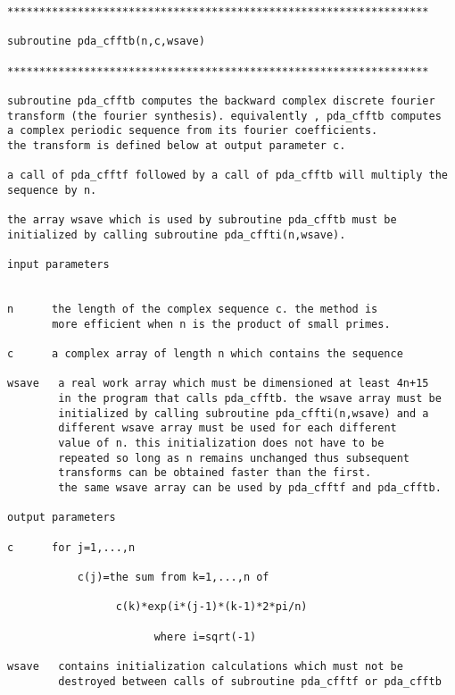 \begin{verbatim}
******************************************************************

subroutine pda_cfftb(n,c,wsave)

******************************************************************

subroutine pda_cfftb computes the backward complex discrete fourier
transform (the fourier synthesis). equivalently , pda_cfftb computes
a complex periodic sequence from its fourier coefficients.
the transform is defined below at output parameter c.

a call of pda_cfftf followed by a call of pda_cfftb will multiply the
sequence by n.

the array wsave which is used by subroutine pda_cfftb must be
initialized by calling subroutine pda_cffti(n,wsave).

input parameters


n      the length of the complex sequence c. the method is
       more efficient when n is the product of small primes.

c      a complex array of length n which contains the sequence

wsave   a real work array which must be dimensioned at least 4n+15
        in the program that calls pda_cfftb. the wsave array must be
        initialized by calling subroutine pda_cffti(n,wsave) and a
        different wsave array must be used for each different
        value of n. this initialization does not have to be
        repeated so long as n remains unchanged thus subsequent
        transforms can be obtained faster than the first.
        the same wsave array can be used by pda_cfftf and pda_cfftb.

output parameters

c      for j=1,...,n

           c(j)=the sum from k=1,...,n of

                 c(k)*exp(i*(j-1)*(k-1)*2*pi/n)

                       where i=sqrt(-1)

wsave   contains initialization calculations which must not be
        destroyed between calls of subroutine pda_cfftf or pda_cfftb
\end{verbatim}



